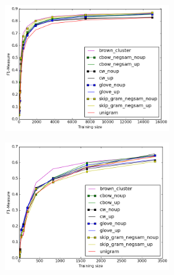 \begin{figure}
\caption{Best results for each method for NER and MWE}
\centering
\begin{subfigure}{.5\textwidth}
	\centering
    	\includegraphics[width=0.8\textwidth]{plots/bestNER.png}
	\label{fig:bestner}
\end{subfigure}
\begin{subfigure}{.5\textwidth}
	\centering
    	\includegraphics[width=0.8\textwidth]{plots/bestMWE.png}
	\label{fig:bestmwe}
\end{subfigure}  	
\end{figure}  	



